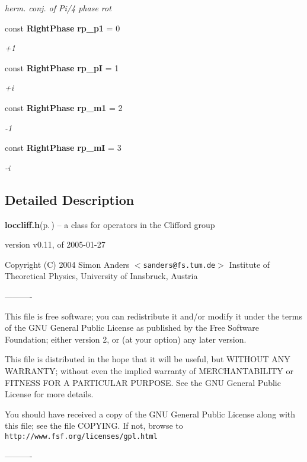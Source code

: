 \begin{CompactItemize}
\begin{CompactList}\small\item\em herm. conj. of Pi/4 phase rot \item\end{CompactList}\item 
const  {\bf Right\-Phase} {\bf rp\_\-p1} = 0\label{loccliff_8h_a14}

\begin{CompactList}\small\item\em +1 \item\end{CompactList}\item 
const  {\bf Right\-Phase} {\bf rp\_\-p\-I} = 1\label{loccliff_8h_a15}

\begin{CompactList}\small\item\em +i \item\end{CompactList}\item 
const  {\bf Right\-Phase} {\bf rp\_\-m1} = 2\label{loccliff_8h_a16}

\begin{CompactList}\small\item\em -1 \item\end{CompactList}\item 
const  {\bf Right\-Phase} {\bf rp\_\-m\-I} = 3\label{loccliff_8h_a17}

\begin{CompactList}\small\item\em -i \item\end{CompactList}\end{CompactItemize}


\subsection{Detailed Description}
{\bf loccliff.h}{\rm (p.\,\pageref{loccliff_8h})} -- a class for operators in the Clifford group

version v0.11, of 2005-01-27

Copyright (C) 2004 Simon Anders $<${\tt sanders@fs.tum.de}$>$ Institute of Theoretical Physics, University of Innsbruck, Austria

----------

This file is free software; you can redistribute it and/or modify it under the terms of the GNU General Public License as published by the Free Software Foundation; either version 2, or (at your option) any later version.

This file is distributed in the hope that it will be useful, but WITHOUT ANY WARRANTY; without even the implied warranty of MERCHANTABILITY or FITNESS FOR A PARTICULAR PURPOSE. See the GNU General Public License for more details.

You should have received a copy of the GNU General Public License along with this file; see the file COPYING. If not, browse to {\tt http://www.fsf.org/licenses/gpl.html}

----------
